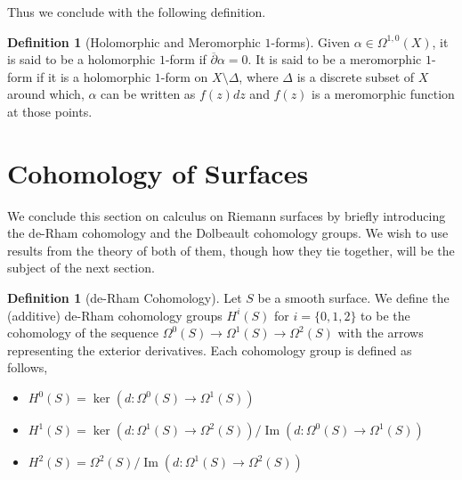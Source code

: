 \documentclass[11pt]{report}
\theoremstyle{definition}
\newtheorem{defn}[thm]{Definition}
\DeclareMathOperator{\im}{Im}
\begin{document}
Thus we conclude with the following definition.
\begin{defn}[Holomorphic and Meromorphic $1$-forms]
  Given $\alpha \in \Omega^{1,0}(X)$, it is said to be a holomorphic $1$-form if $\overline{\partial} \alpha = 0$. It is said to be a meromorphic $1$-form if it is a holomorphic $1$-form on $X\setminus \Delta$, where $\Delta$ is a discrete subset of $X$ around which, $\alpha$ can be written as $f(z)dz$ and $f(z)$ is a meromorphic function at those points.
\end{defn}

\section{Cohomology of Surfaces}
We conclude this section on calculus on Riemann surfaces by briefly introducing the de-Rham cohomology and the Dolbeault cohomology groups. We wish to use results from the theory of both of them, though how they tie together, will be the subject of the next section.
\begin{defn}[de-Rham Cohomology]\label{deRham}
  Let $S$ be a smooth surface. We define the (additive) de-Rham cohomology groups $H^i(S)$ for $i=\{0,1,2\}$ to be the cohomology of the sequence $\Omega^0(S)\rightarrow \Omega^1(S)\rightarrow \Omega^2(S)$ with the arrows representing the exterior derivatives. Each cohomology group is defined as follows,
  \begin{itemize}
    \item $H^0(S)=\ker(d:\Omega^0(S)\rightarrow\Omega^1(S))$
    \item $H^1(S)=\ker(d:\Omega^1(S)\rightarrow\Omega^2(S))/\im(d:\Omega^0(S)\rightarrow \Omega^1(S))$
    \item $H^2(S)=\Omega^2(S)/\im(d:\Omega^1(S)\rightarrow \Omega^2(S))$
  \end{itemize}
\end{defn}
\end{document}
